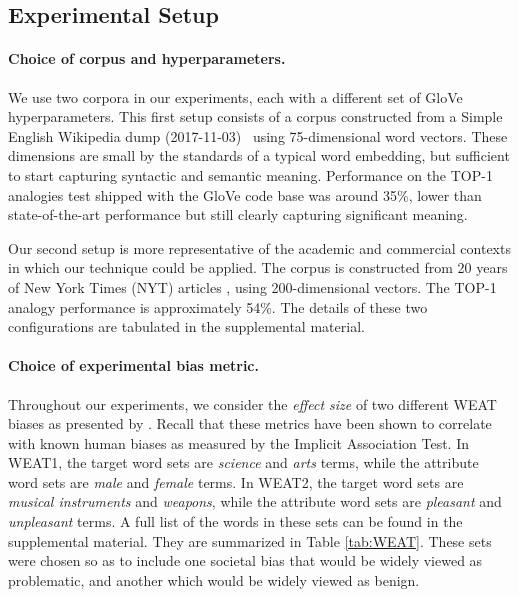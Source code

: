 \documentclass{article}
\newcommand{\xhdr}[1]{\paragraph*{\bf {#1.}}}
\begin{document}
\subsection{Experimental Setup}

\xhdr{Choice of corpus and hyperparameters}
We use two corpora in our experiments, each with a different set of GloVe hyperparameters.
This first setup consists of a corpus constructed from a Simple English Wikipedia dump (2017-11-03)~\cite{Simplewiki} using 75-dimensional word vectors.
These dimensions are small by the standards of a typical word embedding, but sufficient to start capturing syntactic and semantic meaning. Performance on the TOP-1 analogies test shipped with the GloVe code base was around 35\%, lower than state-of-the-art performance but still clearly capturing significant meaning.

Our second setup is more representative of the academic and commercial contexts in which our technique could be applied. The corpus is constructed from 20 years of New York Times (NYT) articles \cite{NewYorkTimes}, using 200-dimensional vectors. The TOP-1 analogy performance is approximately 54\%. The details of these two configurations are tabulated in the supplemental material.


\xhdr{Choice of experimental bias metric}
Throughout our experiments, we consider the \emph{effect size} of two different WEAT biases as presented by \citet{WEAT}.
Recall that these metrics have been shown to correlate with known human biases as measured by the Implicit Association Test.
In WEAT1, the target word sets are \emph{science} and \emph{arts} terms, while the attribute word sets are \emph{male} and \emph{female} terms.
In WEAT2, the target word sets are \emph{musical instruments} and \emph{weapons}, while the attribute word sets are \emph{pleasant} and \emph{unpleasant} terms.
A full list of the words in these sets can be found in the supplemental material. They are summarized in Table \ref{tab:WEAT}.
These sets were chosen so as to include one societal bias that would be widely viewed as problematic, and another which would be widely viewed as benign. 
\end{document}
